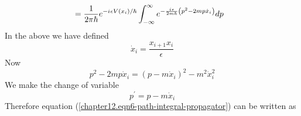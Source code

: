 \begin{enumerate}
\begin{align}
		&= \frac{1}{2\pi\hbar} e^{-{i\mkern1mu} \epsilon V(x_i)/\hbar} \int_{-\infty}^{\infty} e^{-\frac{{i\mkern1mu} \epsilon}{2 m \hbar} \left(p^2 - 2 m p \dot{x}_i \right)} dp
		\label{chapter12.eqn6-path-integral-propagator}
	\end{align}
	In the above we have defined
	\begin{equation}
		\dot{x}_i = \frac{x_{i+1} x_i}{\epsilon}
	\end{equation}
	Now
	\begin{equation}
		p^2 - 2m p \dot{x}_i = (p- m \dot{x}_i)^2 - m^2 \dot{x}_i^2
	\end{equation}
	We make the change of variable
	\begin{equation}
		p^\prime = p -m \dot{x}_i
	\end{equation}
	Therefore equation (\ref{chapter12.eqn6-path-integral-propagator}) can be written as
	

\end{enumerate}
